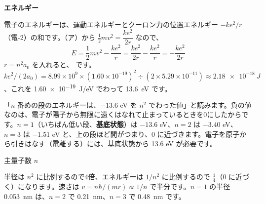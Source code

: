 \noindent\textbf{エネルギー}\par\nobreak
電子のエネルギーは、運動エネルギーとクーロン力の位置エネルギー $-ke^2/r$（電-2）の和です。（ア）から $\tfrac12mv^2=\dfrac{ke^2}{2r}$ なので、
\[ E=\frac12mv^2-\frac{ke^2}{r}=\frac{ke^2}{2r}-\frac{ke^2}{r}=-\frac{ke^2}{2r} \]
$r=n^2a_0$ を入れると、
\label{ph:原-4:juni}です。$ke^2/(2a_0)=8.99\times10^9\times(1.60\times10^{-19})^2\div(2\times5.29\times10^{-11})\approx\qty{2.18e-18}{J}$、これを \qty{1.60e-19}{J/eV} でわって \qty{13.6}{eV} です。

\begin{phyomi}[$E_n=-\dfrac{13.6\ \mathrm{eV}}{n^2}$]
「$n$ 番めの段のエネルギーは、$-13.6$ eV を $n^2$ でわった値」と読みます。負の値なのは、電子が陽子から無限に遠くはなれて止まっているときを0にしたからです。$n=1$（いちばん低い段、\textbf{基底状態}）は $-13.6$ eV、$n=2$ は $-3.40$ eV、$n=3$ は $-1.51$ eV と、上の段ほど間がつまり、0 に近づきます。電子を原子から引きはなす（電離する）には、基底状態から 13.6 eV が必要です。
\end{phyomi}

\begin{phbaisuru}{主量子数 $n$}
\noindent\begin{minipage}[c]{0.5\linewidth}\raggedright
半径は $n^2$ に比例するので4倍、エネルギーは $1/n^2$ に比例するので $\tfrac14$（0 に近づく）になります。速さは $v=n\hbar/(mr)\propto1/n$ で半分です。$n=1$ の半径 \qty{0.053}{nm} は、$n=2$ で \qty{0.21}{nm}、$n=3$ で \qty{0.48}{nm} です。
\end{minipage}\hfill
\begin{minipage}[c]{0.47\linewidth}\centering
{}
\end{minipage}
\end{phbaisuru}

\begin{phflow}
\end{phflow}

